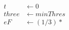 \documentclass[10pt]{article}
\begin{document}
\begin{align*}t &\leftarrow 0 \\
three & \leftarrow minThres \\
eF & \leftarrow (1/3)*\end{align*}
\end{document}
